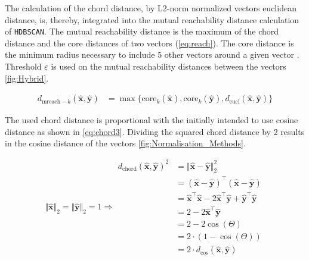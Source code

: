 The calculation of the chord distance, by L2-norm normalized vectors euclidean distance, is, thereby, integrated into the mutual reachability distance calculation of \texttt{HDBSCAN}. The mutual reachability distance is the maximum of the chord distance and the core distances of two vectors (\autoref{eq:reach}). The core distance is the minimum radius necessary to include 5 other vectors around a given vector \autocite{mcinnes_hdbscan_2017}. Threshold $\varepsilon$ is used on the mutual reachability distances between the vectors \autoref{fig:Hybrid}. 

\begin{equation}\label{eq:reach}
    \begin{aligned}
        d_{\text{mreach}-k}(\mathbf{\hat{x}},\mathbf{\hat{y}}) &= \max \{ \text{core}_k(\mathbf{\hat{x}}), \text{core}_k(\mathbf{\hat{y}}), d_{\text{eucl}}(\mathbf{\hat{x}},\mathbf{\hat{y}}) \}
    \end{aligned}
\end{equation}

The used chord distance is proportional with the initially intended to use cosine distance as shown in \autoref{eq:chord3}. Dividing the squared chord distance by 2 results in the cosine distance of the vectors \autoref{fig:Normalisation_Methods}.

\begin{equation}\label{eq:chord3}
    \Vert\mathbf{\hat{x}}\Vert_2 = \Vert\mathbf{\hat{y}}\Vert_2 = 1 \Rightarrow 
    \begin{aligned}  
        d_{\text{chord}}(\mathbf{\hat{x}},\mathbf{\hat{y}})^2 &= \Vert\mathbf{\hat{x}} - \mathbf{\hat{y}}\Vert_2^2\\
        &= (\mathbf{\hat{x}} - \mathbf{\hat{y}})^\top (\mathbf{\hat{x}} - \mathbf{\hat{y}})\\
        &= \mathbf{\hat{x}}^\top \mathbf{\hat{x}} - 2 \mathbf{\hat{x}}^\top \mathbf{\hat{y}} + \mathbf{\hat{y}}^\top \mathbf{\hat{y}}\\
        &= 2 - 2\mathbf{\hat{x}}^\top \mathbf{\hat{y}}\\
        &= 2 - 2 \cos(\Theta)\\
        &= 2 \cdot (1 - \cos(\Theta))\\
        &= 2 \cdot d_{\text{cos}}(\mathbf{\hat{x}},\mathbf{\hat{y}})
    \end{aligned}
\end{equation}

